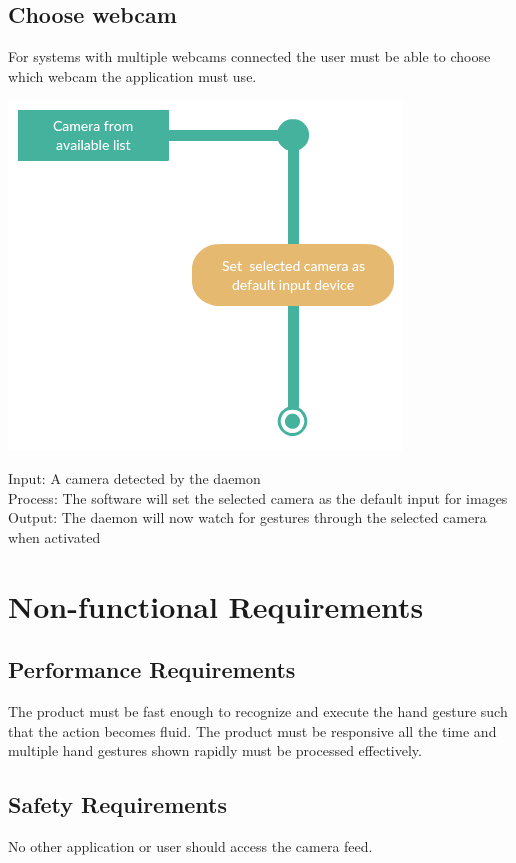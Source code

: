 \documentclass[11pt]{report}
\begin{document}
 \subsection{Choose webcam}
For systems with multiple webcams connected the user must be able to choose which webcam the application must use.
\begin{center}
    \includegraphics[scale=0.5]{camera.png}
\end{center}
Input: A camera detected by the daemon
\\Process: The software will set the selected camera as the default input for images
\\Output: The daemon will now watch for gestures through the selected camera when activated

\section{Non-functional Requirements}    
\subsection{Performance Requirements}
The product must be fast enough to recognize and execute the hand gesture such that the action becomes fluid. The product must be responsive all the time and multiple hand gestures shown rapidly must be processed effectively.

\subsection{Safety Requirements}
No other application or user should access the camera feed.
\end{document}
